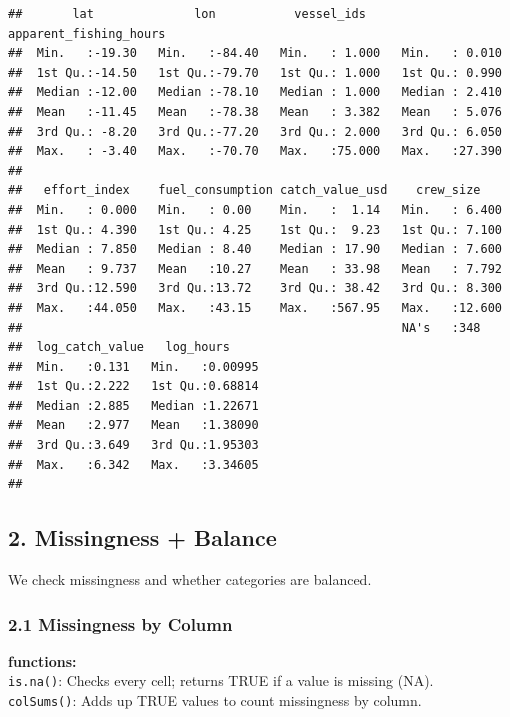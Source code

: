 \documentclass[
]{article}
\begin{document}
\begin{verbatim}
##       lat              lon           vessel_ids     apparent_fishing_hours
##  Min.   :-19.30   Min.   :-84.40   Min.   : 1.000   Min.   : 0.010        
##  1st Qu.:-14.50   1st Qu.:-79.70   1st Qu.: 1.000   1st Qu.: 0.990        
##  Median :-12.00   Median :-78.10   Median : 1.000   Median : 2.410        
##  Mean   :-11.45   Mean   :-78.38   Mean   : 3.382   Mean   : 5.076        
##  3rd Qu.: -8.20   3rd Qu.:-77.20   3rd Qu.: 2.000   3rd Qu.: 6.050        
##  Max.   : -3.40   Max.   :-70.70   Max.   :75.000   Max.   :27.390        
##                                                                           
##   effort_index    fuel_consumption catch_value_usd    crew_size     
##  Min.   : 0.000   Min.   : 0.00    Min.   :  1.14   Min.   : 6.400  
##  1st Qu.: 4.390   1st Qu.: 4.25    1st Qu.:  9.23   1st Qu.: 7.100  
##  Median : 7.850   Median : 8.40    Median : 17.90   Median : 7.600  
##  Mean   : 9.737   Mean   :10.27    Mean   : 33.98   Mean   : 7.792  
##  3rd Qu.:12.590   3rd Qu.:13.72    3rd Qu.: 38.42   3rd Qu.: 8.300  
##  Max.   :44.050   Max.   :43.15    Max.   :567.95   Max.   :12.600  
##                                                     NA's   :348     
##  log_catch_value   log_hours      
##  Min.   :0.131   Min.   :0.00995  
##  1st Qu.:2.222   1st Qu.:0.68814  
##  Median :2.885   Median :1.22671  
##  Mean   :2.977   Mean   :1.38090  
##  3rd Qu.:3.649   3rd Qu.:1.95303  
##  Max.   :6.342   Max.   :3.34605  
## 
\end{verbatim}

\hypertarget{missingness-balance}{%
\subsection{2. Missingness + Balance}\label{missingness-balance}}

We check missingness and whether categories are balanced.

\hypertarget{missingness-by-column}{%
\subsubsection{2.1 Missingness by Column}\label{missingness-by-column}}

\textbf{functions:}\\
\texttt{is.na()}: Checks every cell; returns TRUE if a value is missing
(NA).\\
\texttt{colSums()}: Adds up TRUE values to count missingness by column.
\end{document}
